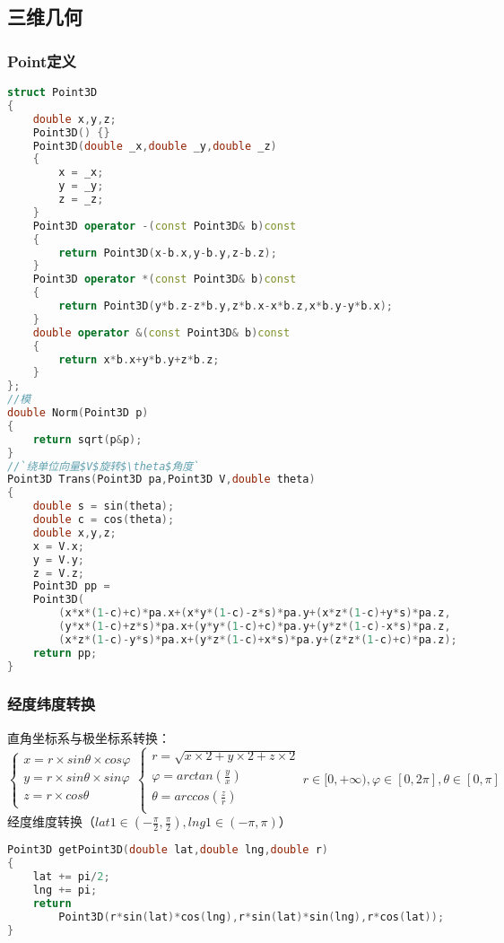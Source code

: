\subsection{三维几何}
	\subsubsection{Point定义}
		\begin{lstlisting}[language=c++]
struct Point3D
{
	double x,y,z;
	Point3D() {}
	Point3D(double _x,double _y,double _z)
	{
		x = _x;
		y = _y;
		z = _z;
	}
	Point3D operator -(const Point3D& b)const
	{
		return Point3D(x-b.x,y-b.y,z-b.z);
	}
	Point3D operator *(const Point3D& b)const
	{
		return Point3D(y*b.z-z*b.y,z*b.x-x*b.z,x*b.y-y*b.x);
	}
	double operator &(const Point3D& b)const
	{
		return x*b.x+y*b.y+z*b.z;
	}
};
//模
double Norm(Point3D p)
{
	return sqrt(p&p);
}
//`绕单位向量$V$旋转$\theta$角度`
Point3D Trans(Point3D pa,Point3D V,double theta)
{
	double s = sin(theta);
	double c = cos(theta);
	double x,y,z;
	x = V.x;
	y = V.y;
	z = V.z;
	Point3D pp = 
	Point3D(
		(x*x*(1-c)+c)*pa.x+(x*y*(1-c)-z*s)*pa.y+(x*z*(1-c)+y*s)*pa.z,
		(y*x*(1-c)+z*s)*pa.x+(y*y*(1-c)+c)*pa.y+(y*z*(1-c)-x*s)*pa.z,
		(x*z*(1-c)-y*s)*pa.x+(y*z*(1-c)+x*s)*pa.y+(z*z*(1-c)+c)*pa.z);
	return pp;
}
		\end{lstlisting}
	
	\subsubsection{经度纬度转换}
		直角坐标系与极坐标系转换：\\
		\[\begin{cases}
		x = r\times sin\theta \times cos\varphi \\
		y = r\times sin\theta \times sin\varphi \\
		z = r\times cos\theta\\
		\end{cases}
		\begin{cases}
		r = \sqrt{x\times 2 + y\times 2 + z\times 2}\\
		\varphi = arctan(\frac{y}{x})\\
		\theta = arccos(\frac{z}{r})\\
		\end{cases}r\in [0,+\infty),\varphi \in [0,2\pi],\theta \in [0,\pi] \]
		经度维度转换（$lat1\in (-\frac{\pi}{2},\frac{\pi}{2}), lng1\in (-\pi,\pi)$）
		\begin{lstlisting}[language=c++]
Point3D getPoint3D(double lat,double lng,double r)
{
	lat += pi/2;
	lng += pi;
	return 
		Point3D(r*sin(lat)*cos(lng),r*sin(lat)*sin(lng),r*cos(lat));
}
		\end{lstlisting}
		
